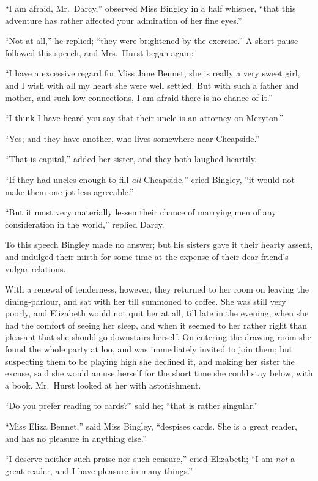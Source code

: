 ``I am afraid, Mr.\ Darcy,'' observed Miss Bingley in a half
whisper, ``that this adventure has rather affected your
admiration of her fine eyes.''

``Not at all,'' he replied; ``they were brightened by the exercise.''
A short pause followed this speech, and Mrs.\ Hurst began again:

``I have a excessive regard for Miss Jane Bennet, she is really
a very sweet girl, and I wish with all my heart she were well
settled.  But with such a father and mother, and such low
connections, I am afraid there is no chance of it.''

``I think I have heard you say that their uncle is an attorney on
Meryton.''

``Yes; and they have another, who lives somewhere near Cheapside.''

``That is capital,'' added her sister, and they both laughed heartily.

``If they had uncles enough to fill \emph{all} Cheapside,'' cried
Bingley, ``it would not make them one jot less agreeable.''

``But it must very materially lessen their chance of marrying men
of any consideration in the world,'' replied Darcy.

To this speech Bingley made no answer; but his sisters gave it
their hearty assent, and indulged their mirth for some time at the
expense of their dear friend's vulgar relations.

With a renewal of tenderness, however, they returned to her
room on leaving the dining-parlour, and sat with her till
summoned to coffee.  She was still very poorly, and Elizabeth
would not quit her at all, till late in the evening, when she had
the comfort of seeing her sleep, and when it seemed to her rather
right than pleasant that she should go downstairs herself.  On
entering the drawing-room she found the whole party at loo, and
was immediately invited to join them; but suspecting them to be
playing high she declined it, and making her sister the excuse,
said she would amuse herself for the short time she could stay
below, with a book.  Mr.\ Hurst looked at her with astonishment.

``Do you prefer reading to cards?'' said he; ``that is rather
singular.''

``Miss Eliza Bennet,'' said Miss Bingley, ``despises cards.  She is
a great reader, and has no pleasure in anything else.''

``I deserve neither such praise nor such censure,'' cried Elizabeth;
``I am \emph{not} a great reader, and I have pleasure in many things.''

